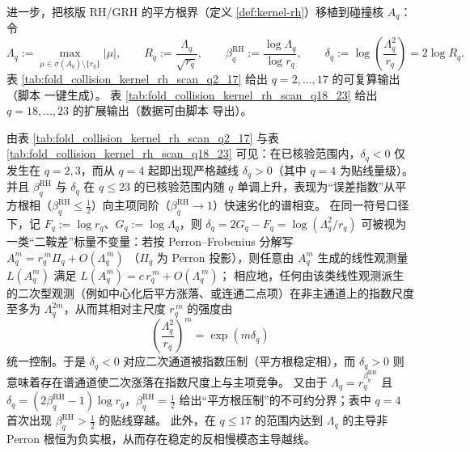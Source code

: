 
进一步，把核版 RH/GRH 的平方根界（定义 \ref{def:kernel-rh}）移植到碰撞核 \(A_q\)：令
\[
\Lambda_q:=\max_{\mu\in\sigma(A_q)\setminus\{r_q\}}|\mu|,
\qquad
R_q:=\frac{\Lambda_q}{\sqrt{r_q}},
\qquad
\beta^{\mathrm{RH}}_q:=\frac{\log \Lambda_q}{\log r_q},
\qquad
\delta_q:=\log\!\left(\frac{\Lambda_q^2}{r_q}\right)=2\log R_q.
\]
表 \ref{tab:fold_collision_kernel_rh_scan_q2_17} 给出 \(q=2,\dots,17\) 的可复算输出（脚本  一键生成）。
表 \ref{tab:fold_collision_kernel_rh_scan_q18_23} 给出 \(q=18,\dots,23\) 的扩展输出（数据可由脚本  导出）。



\begin{remark}[从 \texorpdfstring{$q=4$}{q=4} 起的系统性越线与快速劣化]\label{rem:pom-collision-kernel-rh-phase}
由表 \ref{tab:fold_collision_kernel_rh_scan_q2_17} 与表 \ref{tab:fold_collision_kernel_rh_scan_q18_23} 可见：在已核验范围内，\(\delta_q<0\) 仅发生在 \(q=2,3\)，而从 \(q=4\) 起即出现严格越线 \(\delta_q>0\)（其中 \(q=4\) 为贴线量级）。
并且 \(\beta^{\mathrm{RH}}_q\) 与 \(\delta_q\) 在 \(q\le 23\) 的已核验范围内随 \(q\) 单调上升，表现为“误差指数”从平方根相（\(\beta^{\mathrm{RH}}_q\le\frac12\)）向主项同阶（\(\beta^{\mathrm{RH}}_q\to 1\)）快速劣化的谱相变。
在同一符号口径下，记 \(F_q:=\log r_q\)、\(G_q:=\log\Lambda_q\)，则
\(\delta_q=2G_q-F_q=\log(\Lambda_q^2/r_q)\) 可被视为一类“二鞍差”标量不变量：若按 Perron--Frobenius 分解写
\(
A_q^m=r_q^{\,m}\Pi_q+O(\Lambda_q^{\,m})
\)
（\(\Pi_q\) 为 Perron 投影），则任意由 \(A_q^m\) 生成的线性观测量 \(L(A_q^m)\) 满足
\(
L(A_q^m)=c\,r_q^{\,m}+O(\Lambda_q^{\,m})
\)；
相应地，任何由该类线性观测派生的二次型观测（例如中心化后平方涨落、或连通二点项）在非主通道上的指数尺度至多为 \(\Lambda_q^{2m}\)，从而其相对主尺度 \(r_q^{\,m}\) 的强度由
\[
\left(\frac{\Lambda_q^2}{r_q}\right)^{m}=\exp(m\delta_q)
\]
统一控制。于是 \(\delta_q<0\) 对应二次通道被指数压制（平方根稳定相），而 \(\delta_q>0\) 则意味着存在谱通道使二次涨落在指数尺度上与主项竞争。
又由于 \(\Lambda_q=r_q^{\beta^{\mathrm{RH}}_q}\) 且 \(\delta_q=(2\beta^{\mathrm{RH}}_q-1)\log r_q\)，\(\beta^{\mathrm{RH}}_q=\tfrac12\) 给出“平方根压制”的不可约分界；表中 \(q=4\) 首次出现 \(\beta^{\mathrm{RH}}_q>\tfrac12\) 的贴线穿越。
此外，在 \(q\le 17\) 的范围内达到 \(\Lambda_q\) 的主导非 Perron 根恒为负实根，从而存在稳定的反相慢模态主导越线。
\end{remark}

